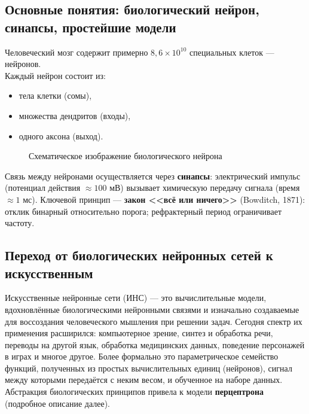 \documentclass[../NDCNNAI_main.tex]{subfiles}
\begin{document}
\subsection{Основные понятия: биологический нейрон, синапсы, простейшие модели}
Человеческий мозг содержит примерно $8{,}6 \times 10^{10}$ специальных клеток --- нейронов.\\
Каждый нейрон состоит из:
\begin{itemize}
    \item тела клетки (сомы),
    \item множества дендритов (входы),
    \item одного аксона (выход).
\end{itemize}

\begin{figure}[!ht]
    \centering

    \caption{Схематическое изображение биологического нейрона}
\end{figure}

Связь между нейронами осуществляется через \textbf{синапсы}: электрический импульс (потенциал действия $\approx 100$ мВ) вызывает химическую передачу сигнала (время $\approx 1$ мс).
Ключевой принцип --- \textbf{закон <<всё или ничего>>} (Bowditch, 1871): отклик бинарный относительно порога; рефрактерный период ограничивает частоту.

\subsection{Переход от биологических нейронных сетей к искусственным}
Искусственные нейронные сети (ИНС) --- это вычислительные модели, вдохновлённые биологическими нейронными связями и изначально создаваемые для воссоздания человеческого мышления при решении задач.
Сегодня спектр их применения расширился: компьютерное зрение, синтез и обработка речи, переводы на другой язык, обработка медицинских данных, поведение персонажей в играх и многое другое.
Более формально это параметрическое семейство функций, полученных из простых вычислительных единиц (нейронов), сигнал между которыми передаётся с неким весом, и обученное на наборе данных.
Абстракция биологических принципов привела к модели \textbf{перцептрона} (подробное описание далее).
\end{document}
